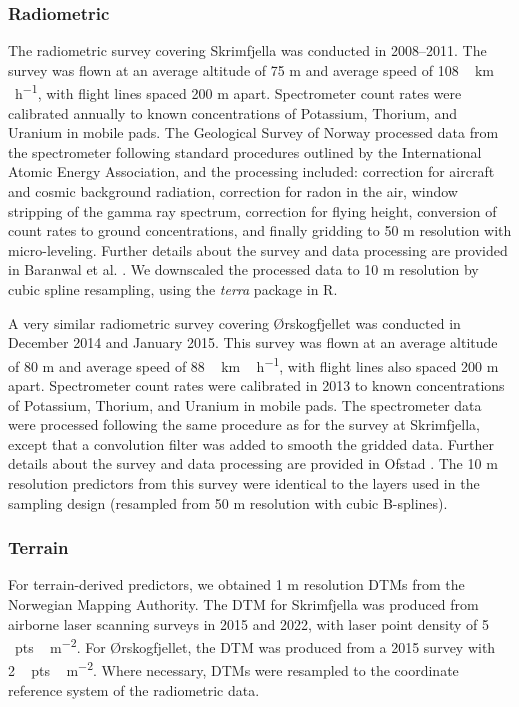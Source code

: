 \documentclass[soil, manuscript]{copernicus}
\begin{document}
\subsubsection{Radiometric}

The radiometric survey covering Skrimfjella was conducted in 2008--2011.
The survey was flown at an average altitude of 75 m and average speed of \unit{108\,km\,h^{-1}}, with flight lines spaced 200 m apart.
Spectrometer count rates were calibrated annually to known concentrations of Potassium, Thorium, and Uranium in mobile pads.
The Geological Survey of Norway processed data from the spectrometer following standard procedures outlined by the International Atomic Energy Association, and the processing included: correction for aircraft and cosmic background radiation, correction for radon in the air, window stripping of the gamma ray spectrum, correction for flying height, conversion of count rates to ground concentrations, and finally gridding to 50 m resolution with micro-leveling.
Further details about the survey and data processing are provided in Baranwal et al. \citeyearpar{baranwalHelicopterborneMagneticElectromagnetic2013}.
We downscaled the processed data to 10 m resolution by cubic spline resampling, using the \emph{terra} package in R.

A very similar radiometric survey covering Ørskogfjellet was conducted in December 2014 and January 2015.
This survey was flown at an average altitude of 80 m and average speed of \unit{88\,km\,h^{-1}}, with flight lines also spaced 200 m apart.
Spectrometer count rates were calibrated in 2013 to known concentrations of Potassium, Thorium, and Uranium in mobile pads.
The spectrometer data were processed following the same procedure as for the survey at Skrimfjella, except that a convolution filter was added to smooth the gridded data.
Further details about the survey and data processing are provided in Ofstad \citeyearpar{ofstadHelicopterborneMagneticRadiometric2015}.
The 10 m resolution predictors from this survey were identical to the layers used in the sampling design (resampled from 50 m resolution with cubic B-splines).

\subsubsection{Terrain}

For terrain-derived predictors, we obtained 1 m resolution DTMs from the Norwegian Mapping Authority.
The DTM for Skrimfjella was produced from airborne laser scanning surveys in 2015 and 2022, with laser point density of \unit{5\,pts\,m^{-2}}.
For Ørskogfjellet, the DTM was produced from a 2015 survey with \unit{2\,pts\,m^{-2}}.
Where necessary, DTMs were resampled to the coordinate reference system of the radiometric data.
\end{document}
